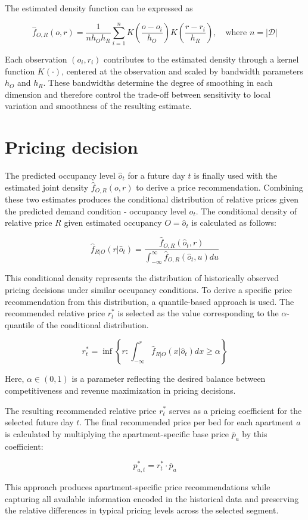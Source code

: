 The estimated density function can be expressed as

\begin{equation}
    \hat{f}_{O,R}(o,r) =
    \frac{1}{n h_O h_R}
    \sum_{i=1}^{n}
    K\left(\frac{o-o_i}{h_O}\right)
    K\left(\frac{r-r_i}{h_R}\right), \quad \text{where } n = |\mathcal D|
\end{equation}

Each observation $(o_i,r_i)$ contributes to the estimated density through a kernel function $K(\cdot)$, centered at the observation and scaled by bandwidth parameters $h_O$ and $h_R$. These bandwidths determine the degree of smoothing in each dimension and therefore control the trade-off between sensitivity to local variation and smoothness of the resulting estimate.

\section{Pricing decision}
The predicted occupancy level $\hat{o}_t$ for a future day $t$ is finally used with the estimated joint density $\hat{f}_{O,R}(o,r)$ to derive a price recommendation. Combining these two estimates produces the conditional distribution of relative prices given the predicted demand condition - occupancy level $\hat{o}_t$. The conditional density of relative price $R$ given estimated occupancy $O = \hat{o}_t$ is calculated as follows:

\begin{equation}
    \hat{f}_{R|O}(r|\hat{o}_t) =
    \frac{\hat{f}_{O,R}(\hat{o}_t,r)}{\int_{-\infty}^{\infty} \hat{f}_{O,R}(\hat{o}_t,u) du}
\end{equation}

This conditional density represents the distribution of historically observed pricing decisions under similar occupancy conditions. To derive a specific price recommendation from this distribution, a quantile-based approach is used. The recommended relative price $r^*_t$ is selected as the value corresponding to the $\alpha$-quantile of the conditional distribution.

\begin{equation}
    r^*_t =
    \inf \left\{r: \int_{-\infty}^r \hat{f}_{R|O}(x|\hat{o}_t) dx \geq \alpha \right\}
\end{equation}

Here, $\alpha \in (0,1)$ is a parameter reflecting the desired balance between competitiveness and revenue maximization in pricing decisions.

The resulting recommended relative price $r_t^*$ serves as a pricing coefficient for the selected future day $t$. The final recommended price per bed for each apartment $a$ is calculated by multiplying the apartment-specific base price $\bar{p}_a$ by this coefficient:

\begin{equation}
    p_{a,t}^* = r_t^* \cdot \bar{p}_a
\end{equation}

This approach produces apartment-specific price recommendations while capturing all available information encoded in the historical data and preserving the relative differences in typical pricing levels across the selected segment.